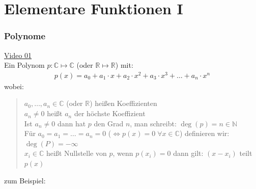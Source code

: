 \chapter{Elementare Funktionen I}

\setcounter{section}{7}
\setcounter{subsection}{0}
\setcounter{subsubsection}{1}
\setcounter{secnumdepth}{4}
\subsection{Polynome}
\href{https://youtu.be/b0zNTRgnXPM}{Video 01}\\
Ein Polynom $ p: \mathbb{C}\longmapsto  \mathbb{C} $ (oder $\mathbb{R}\longmapsto \mathbb{R}  $) mit:\\
\begin{align*}
p(x)=a_0+a_1\cdot x+a_2\cdot x^2+a_3\cdot x^3+\ldots+a_n\cdot x^n
\end{align*}
wobei:
\begin{quote}
	\textbullet\;\;$ a_0,\ldots,a_n \in \mathbb{C}$ (oder $ \mathbb{R} $) heißen Koeffizienten \\
	\textbullet\;\;$ a_n\neq 0 $ heißt $ a_n $ der höchste Koeffizient\\
	\textbullet\;\;Ist $ a_n\neq 0 $ dann hat $ p $ den Grad $ n $, man schreibt: $ \deg(p)=n\in\mathbb{N} $\\
	\textbullet\;\;Für $ a_0=a_1=\ldots=a_n=0 $ ($ \Leftrightarrow p(x)=0\;\forall x\in \mathbb{C}$) definieren wir: $ \deg(P)=-\infty $\\
	\textbullet \;\;$ x_i\in  \mathbb{C} $ heißt Nullstelle von $ p $, wenn $ p(x_i)=0 $ dann gilt: $ (x-x_i) $ teilt $ p(x) $
\end{quote} 
zum Beispiel:\\
